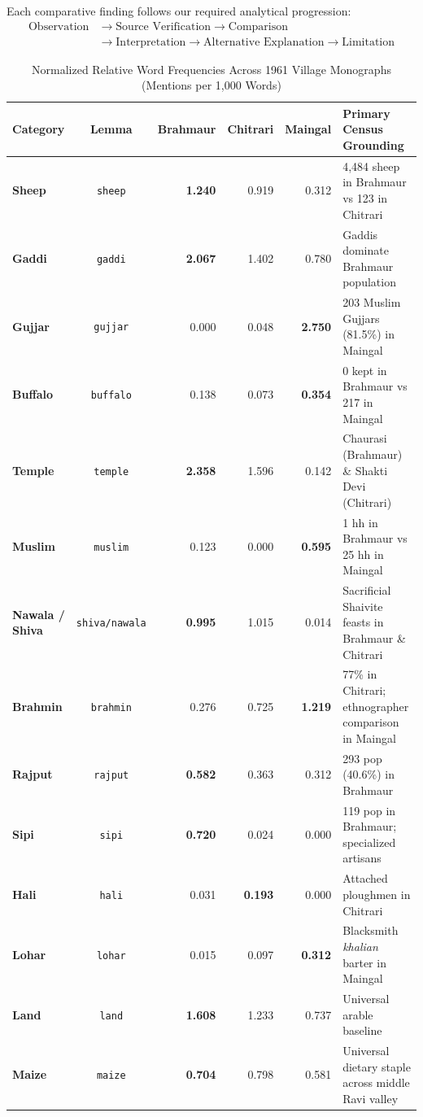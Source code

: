 \documentclass[11pt,a4paper]{article}
\begin{document}
Each comparative finding follows our required analytical progression:
\[
\begin{aligned}
\text{Observation} &\longrightarrow \text{Source Verification} \longrightarrow \text{Comparison} \\
&\longrightarrow \text{Interpretation} \longrightarrow \text{Alternative Explanation} \longrightarrow \text{Limitation}
\end{aligned}
\]

\begin{table}[H]
\centering
\small
\caption{Normalized Relative Word Frequencies Across 1961 Village Monographs (Mentions per 1,000 Words)}
\label{tab:frequencies}
\begin{tabularx}{\textwidth}{lcrrrX}
\toprule
\textbf{Category} & \textbf{Lemma} & \textbf{Brahmaur} & \textbf{Chitrari} & \textbf{Maingal} & \textbf{Primary Census Grounding} \\
\midrule
\textbf{Sheep} & \texttt{sheep} & \textbf{1.240} & 0.919 & 0.312 & 4,484 sheep in Brahmaur vs 123 in Chitrari \\
\textbf{Gaddi} & \texttt{gaddi} & \textbf{2.067} & 1.402 & 0.780 & Gaddis dominate Brahmaur population \\
\textbf{Gujjar} & \texttt{gujjar} & 0.000 & 0.048 & \textbf{2.750} & 203 Muslim Gujjars (81.5\%) in Maingal \\
\textbf{Buffalo} & \texttt{buffalo} & 0.138 & 0.073 & \textbf{0.354} & 0 kept in Brahmaur vs 217 in Maingal \\
\textbf{Temple} & \texttt{temple} & \textbf{2.358} & 1.596 & 0.142 & Chaurasi (Brahmaur) \& Shakti Devi (Chitrari) \\
\textbf{Muslim} & \texttt{muslim} & 0.123 & 0.000 & \textbf{0.595} & 1 hh in Brahmaur vs 25 hh in Maingal \\
\textbf{Nawala / Shiva} & \texttt{shiva/nawala} & \textbf{0.995} & 1.015 & 0.014 & Sacrificial Shaivite feasts in Brahmaur \& Chitrari \\
\textbf{Brahmin} & \texttt{brahmin} & 0.276 & 0.725 & \textbf{1.219} & 77\% in Chitrari; ethnographer comparison in Maingal \\
\textbf{Rajput} & \texttt{rajput} & \textbf{0.582} & 0.363 & 0.312 & 293 pop (40.6\%) in Brahmaur \\
\textbf{Sipi} & \texttt{sipi} & \textbf{0.720} & 0.024 & 0.000 & 119 pop in Brahmaur; specialized artisans \\
\textbf{Hali} & \texttt{hali} & 0.031 & \textbf{0.193} & 0.000 & Attached ploughmen in Chitrari \\
\textbf{Lohar} & \texttt{lohar} & 0.015 & 0.097 & \textbf{0.312} & Blacksmith \textit{khalian} barter in Maingal \\
\textbf{Land} & \texttt{land} & \textbf{1.608} & 1.233 & 0.737 & Universal arable baseline \\
\textbf{Maize} & \texttt{maize} & \textbf{0.704} & 0.798 & 0.581 & Universal dietary staple across middle Ravi valley \\
\bottomrule
\end{tabularx}
\end{table}
\end{document}
